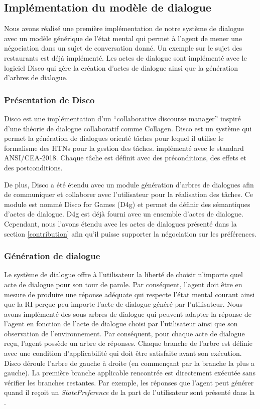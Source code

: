 \documentclass [french]{sig-alternate-05-2015}
\begin{document}
\subsection{Implémentation du modèle de dialogue}

\par Nous avons réalisé une première implémentation de notre système de dialogue avec un modèle générique de l'état mental qui permet à l'agent de mener une négociation dans un sujet de conversation donné. Un exemple sur le sujet des restaurants est déjà implémenté. Les actes de dialogue sont implémenté avec le logiciel Disco \cite{rich2009building} qui gère la création d'actes de dialogue ainsi que la génération d'arbres de dialogue.

\subsubsection{Présentation de Disco}
Disco est une implémentation d'un ``collaborative discourse manager'' inspiré d'une théorie de dialogue collaboratif comme Collagen.  Disco est un système qui permet la génération de dialogues orienté tâches pour lequel il utilise le formalisme des HTNs pour la gestion des tâches. implémenté avec le standard ANSI/CEA-2018.
Chaque tâche est définit avec des préconditions, des effets et des postconditions. 
\par De plus, Disco a été étendu avec un module génération d'arbres de dialogues afin de communiquer et collaborer avec l'utilisateur pour la réalisation des tâches. Ce module est nommé Disco for Games (D4g) et permet de définir des sémantiques d'actes de dialogue. D4g est déjà fourni avec un ensemble d'actes de dialogue. Cependant, nous l'avons étendu avec les actes de dialogues présenté dans la section \ref{contribution} afin qu'il puisse supporter la négociation sur les préférences. 
\subsubsection{Génération de dialogue} 
 \par Le système de dialogue offre à l'utilisateur la liberté de choisir n'importe quel acte de dialogue pour son tour de parole. Par conséquent, l'agent doit être en mesure de produire une réponse adéquate qui respecte l'état mental courant ainsi que la RI perçue peu importe l'acte de dialogue généré par l'utilisateur. Nous avons implémenté des sous arbres de dialogue qui peuvent adapter la réponse de l'agent en fonction de  l'acte de dialogue choisi par l'utilisateur ainsi que son observation de l'environnement. Par conséquent, pour chaque acte de dialogue reçu, l'agent possède un arbre de réponses. Chaque branche de l'arbre est définie avec une condition d’applicabilité qui doit être satisfaite avant son exécution. Disco déroule l'arbre de gauche à droite (en commençant par la branche la plus a gauche). La première branche applicable rencontrée est directement exécutée sans vérifier les branches restantes.
 Par exemple, les réponses que l'agent peut générer quand il reçoit un \emph{StatePreference} de la part de l'utilisateur sont présenté dans la .
\end{document}
